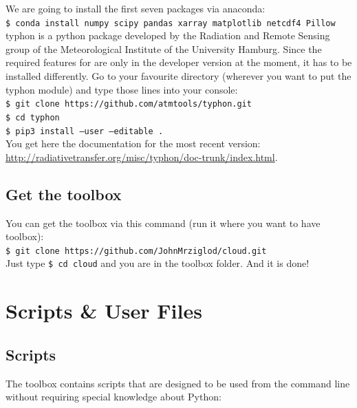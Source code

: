 \documentclass[11pt,a4paper]{article}
\begin{document}
We are going to install the first seven packages via anaconda:\\
\texttt{\$ conda install numpy scipy pandas xarray matplotlib netcdf4 Pillow}\\

typhon is a python package developed by the Radiation and Remote Sensing group of the Meteorological Institute of the University Hamburg. Since the required features for \cloud are only in the developer version at the moment, it has to be installed differently. Go to your favourite directory (wherever you want to put the typhon module) and type those lines into your console:\\
\texttt{\$ git clone https://github.com/atmtools/typhon.git}\\
\texttt{\$ cd typhon}\\
\texttt{\$ pip3 install --user --editable .}\\

You get here the documentation for the most recent version: \url{http://radiativetransfer.org/misc/typhon/doc-trunk/index.html}.

\subsection{Get the \cloud toolbox}
You can get the \cloud toolbox via this command (run it where you want to have \cloud toolbox):\\
\texttt{\$ git clone https://github.com/JohnMrziglod/cloud.git}\\

Just type \texttt{\$ cd cloud} and you are in the toolbox folder. And it is done!

\section{Scripts \& User Files}
\label{sec:scripts-and-files}
\subsection{Scripts}
\label{sec:scripts}
The \cloud toolbox contains scripts that are designed to be used from the command line without requiring special knowledge about Python:
\end{document}
